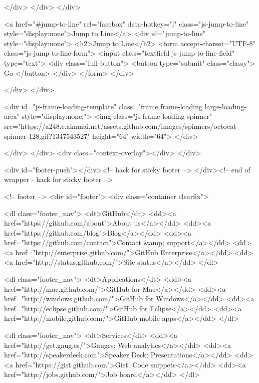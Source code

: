           </div>
        </div>
      </div>

      <a href="#jump-to-line" rel="facebox" data-hotkey="l" class="js-jump-to-line" style="display:none">Jump to Line</a>
      <div id="jump-to-line" style="display:none">
        <h2>Jump to Line</h2>
        <form accept-charset="UTF-8" class="js-jump-to-line-form">
          <input class="textfield js-jump-to-line-field" type="text">
          <div class="full-button">
            <button type="submit" class="classy">
              Go
            </button>
          </div>
        </form>
      </div>

    </div>
</div>

<div id="js-frame-loading-template" class="frame frame-loading large-loading-area" style="display:none;">
  <img class="js-frame-loading-spinner" src="https://a248.e.akamai.net/assets.github.com/images/spinners/octocat-spinner-128.gif?1347543527" height="64" width="64">
</div>


        </div>
      </div>
      <div class="context-overlay"></div>
    </div>

      <div id="footer-push"></div><!-- hack for sticky footer -->
    </div><!-- end of wrapper - hack for sticky footer -->

      <!-- footer -->
      <div id="footer">
  <div class="container clearfix">

      <dl class="footer_nav">
        <dt>GitHub</dt>
        <dd><a href="https://github.com/about">About us</a></dd>
        <dd><a href="https://github.com/blog">Blog</a></dd>
        <dd><a href="https://github.com/contact">Contact &amp; support</a></dd>
        <dd><a href="http://enterprise.github.com/">GitHub Enterprise</a></dd>
        <dd><a href="http://status.github.com/">Site status</a></dd>
      </dl>

      <dl class="footer_nav">
        <dt>Applications</dt>
        <dd><a href="http://mac.github.com/">GitHub for Mac</a></dd>
        <dd><a href="http://windows.github.com/">GitHub for Windows</a></dd>
        <dd><a href="http://eclipse.github.com/">GitHub for Eclipse</a></dd>
        <dd><a href="http://mobile.github.com/">GitHub mobile apps</a></dd>
      </dl>

      <dl class="footer_nav">
        <dt>Services</dt>
        <dd><a href="http://get.gaug.es/">Gauges: Web analytics</a></dd>
        <dd><a href="http://speakerdeck.com">Speaker Deck: Presentations</a></dd>
        <dd><a href="https://gist.github.com">Gist: Code snippets</a></dd>
        <dd><a href="http://jobs.github.com/">Job board</a></dd>
      </dl>

